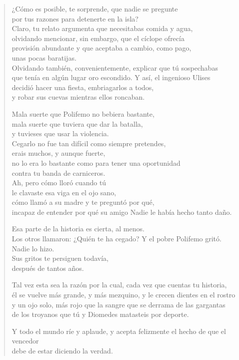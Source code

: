 \documentclass[11pt,a4paper]{article}
\begin{document}
\begin{verse}
¿Cómo es posible, te sorprende, que nadie se pregunte\\
por tus razones para detenerte en la isla?\\
Claro, tu relato argumenta que necesitabas comida y agua,\\
olvidando mencionar, sin embargo, que el cíclope ofrecía\\
provisión abundante y que aceptaba a cambio, como pago,\\
unas pocas baratijas.\\
Olvidando también, convenientemente, explicar que tú sospechabas\\
que tenía en algún lugar oro escondido. Y así, el ingenioso Ulises\\
decidió hacer una fiesta, embriagarlos a todos,\\
y robar sus cuevas mientras ellos roncaban.

Mala suerte que Polifemo no bebiera bastante,\\
mala suerte que tuviera que dar la batalla,\\
y tuvieses que usar la violencia.\\
Cegarlo no fue tan difícil como siempre pretendes,\\
erais muchos, y aunque fuerte,\\
no lo era lo bastante como para tener una oportunidad\\
contra tu banda de carniceros.\\
Ah, pero cómo lloró cuando tú\\
le clavaste esa viga en el ojo sano,\\
cómo llamó a su madre y te preguntó por qué,\\
incapaz de entender por qué su amigo Nadie le había hecho tanto daño.

Esa parte de la historia es cierta, al menos.\\
Los otros llamaron: ¿Quién te ha cegado? Y el pobre Polifemo gritó.\\
Nadie lo hizo.\\
Sus gritos te persiguen todavía,\\
después de tantos años.

Tal vez esta sea la razón por la cual, cada vez que cuentas tu historia,\\
él se vuelve más grande, y más mezquino, y le crecen dientes en el rostro\\
y un ojo solo, más rojo que la sangre que se derrama de las gargantas\\
de los troyanos que tú y Diomedes matasteis por deporte.

Y todo el mundo ríe y aplaude, y acepta felizmente el hecho de que el vencedor\\
debe de estar diciendo la verdad.
\end{verse}
\end{document}
